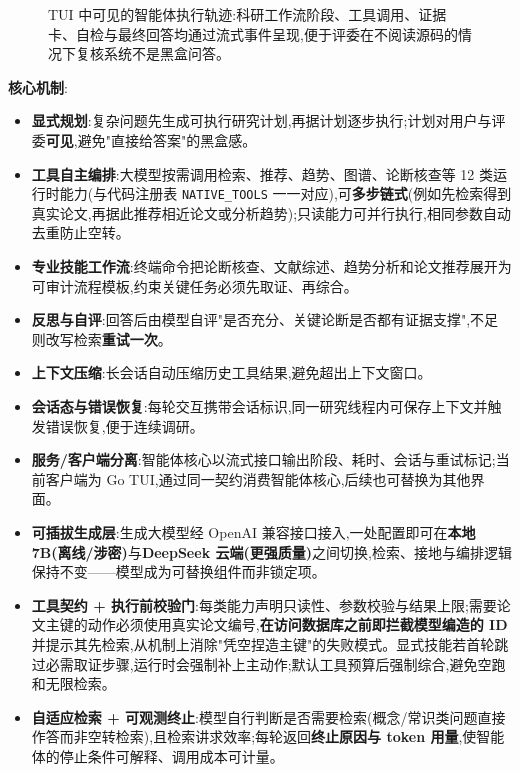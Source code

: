 \begin{figure}[!htbp]
\centering
{}
\caption{TUI 中可见的智能体执行轨迹:科研工作流阶段、工具调用、证据卡、自检与最终回答均通过流式事件呈现,便于评委在不阅读源码的情况下复核系统不是黑盒问答。}
\label{fig:agent-trace}
\end{figure}

\textbf{核心机制}:
\begin{itemize}
\item \textbf{显式规划}:复杂问题先生成可执行研究计划,再据计划逐步执行;计划对用户与评委\textbf{可见},避免"直接给答案"的黑盒感。
\item \textbf{工具自主编排}:大模型按需调用检索、推荐、趋势、图谱、论断核查等 12 类运行时能力(与代码注册表 \texttt{NATIVE\_TOOLS} 一一对应),可\textbf{多步链式}(例如先检索得到真实论文,再据此推荐相近论文或分析趋势);只读能力可并行执行,相同参数自动去重防止空转。
\item \textbf{专业技能工作流}:终端命令把论断核查、文献综述、趋势分析和论文推荐展开为可审计流程模板,约束关键任务必须先取证、再综合。
\item \textbf{反思与自评}:回答后由模型自评"是否充分、关键论断是否都有证据支撑",不足则改写检索\textbf{重试一次}。
\item \textbf{上下文压缩}:长会话自动压缩历史工具结果,避免超出上下文窗口。
\item \textbf{会话态与错误恢复}:每轮交互携带会话标识,同一研究线程内可保存上下文并触发错误恢复,便于连续调研。
\item \textbf{服务/客户端分离}:智能体核心以流式接口输出阶段、耗时、会话与重试标记;当前客户端为 Go TUI,通过同一契约消费智能体核心,后续也可替换为其他界面。
\item \textbf{可插拔生成层}:生成大模型经 OpenAI 兼容接口接入,一处配置即可在\textbf{本地 7B(离线/涉密)}与\textbf{DeepSeek 云端(更强质量)}之间切换,检索、接地与编排逻辑保持不变——模型成为可替换组件而非锁定项。
\item \textbf{工具契约 + 执行前校验门}:每类能力声明只读性、参数校验与结果上限;需要论文主键的动作必须使用真实论文编号,\textbf{在访问数据库之前即拦截模型编造的 ID} 并提示其先检索,从机制上消除"凭空捏造主键"的失败模式。显式技能若首轮跳过必需取证步骤,运行时会强制补上主动作;默认工具预算后强制综合,避免空跑和无限检索。
\item \textbf{自适应检索 + 可观测终止}:模型自行判断是否需要检索(概念/常识类问题直接作答而非空转检索),且检索讲求效率;每轮返回\textbf{终止原因与 token 用量},使智能体的停止条件可解释、调用成本可计量。
\end{itemize}

